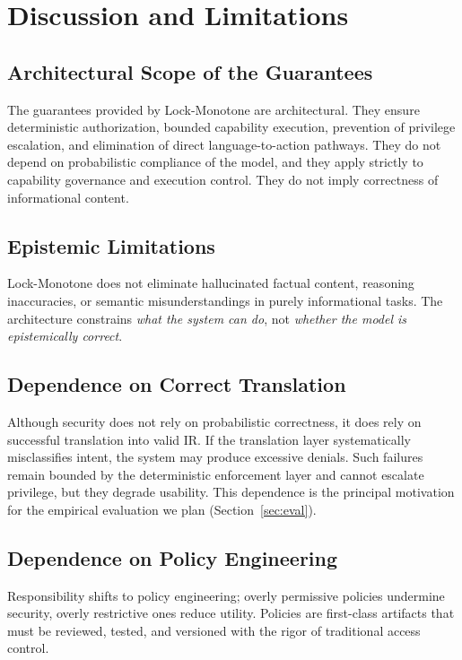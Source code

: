 \documentclass[conference]{IEEEtran}
\begin{document}
\section{Discussion and Limitations}
\label{sec:discussion}

\subsection{Architectural Scope of the Guarantees}
The guarantees provided by Lock-Monotone are architectural. They ensure
deterministic authorization, bounded capability execution, prevention of
privilege escalation, and elimination of direct language-to-action
pathways. They do not depend on probabilistic compliance of the model, and
they apply strictly to capability governance and execution control. They
do not imply correctness of informational content.

\subsection{Epistemic Limitations}
Lock-Monotone does not eliminate hallucinated factual content, reasoning
inaccuracies, or semantic misunderstandings in purely informational tasks.
The architecture constrains \emph{what the system can do}, not
\emph{whether the model is epistemically correct}.

\subsection{Dependence on Correct Translation}
Although security does not rely on probabilistic correctness, it does rely
on successful translation into valid IR. If the translation layer
systematically misclassifies intent, the system may produce excessive
denials. Such failures remain bounded by the deterministic enforcement
layer and cannot escalate privilege, but they degrade usability. This
dependence is the principal motivation for the empirical evaluation we
plan (Section~\ref{sec:eval}).

\subsection{Dependence on Policy Engineering}
Responsibility shifts to policy engineering; overly permissive policies
undermine security, overly restrictive ones reduce utility. Policies are
first-class artifacts that must be reviewed, tested, and versioned with the
rigor of traditional access control.
\end{document}
